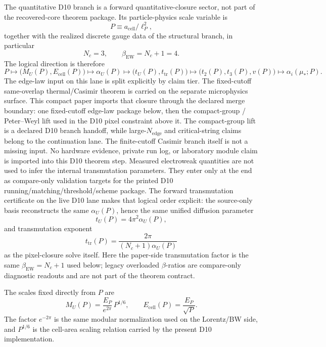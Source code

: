\documentclass[11pt]{article}
\begin{document}
The quantitative D10 branch is a forward quantitative-closure sector, not part of the recovered-core theorem package. Its particle-physics scale variable is
\[
P \equiv a_{\mathrm{cell}}/\ell_P^2,
\]
together with the realized discrete gauge data of the structural branch, in particular
\[
N_c=3,
\qquad
\beta_{\mathrm{EW}}=N_c+1=4.
\]
The logical direction is therefore
\[
P
\longmapsto
\bigl(M_U(P),E_{\mathrm{cell}}(P)\bigr)
\longmapsto
\alpha_U(P)
\longmapsto
\bigl(t_U(P),t_{\mathrm{tr}}(P)\bigr)
\longmapsto
\bigl(t_2(P),t_3(P),v(P)\bigr)
\longmapsto
\alpha_i(\mu_\ast;P).
\]
The edge-law input on this lane is split explicitly by claim tier. The fixed-cutoff
same-overlap thermal/Casimir theorem is carried on the separate microphysics surface. This
compact paper imports that closure through the declared merge boundary: one fixed-cutoff
edge-law package below, then the compact-group / Peter--Weyl lift used in the D10 pixel
constraint above it. The compact-group lift is a declared D10 branch handoff, while
large-\(N_{\mathrm{edge}}\) and critical-string claims belong to the continuation lane. The
finite-cutoff Casimir branch itself is not a missing input. No hardware evidence, private run
log, or laboratory module claim is imported into this D10 theorem step.
Measured electroweak quantities are not used to infer the internal transmutation parameters. They enter only at the end as compare-only validation targets for the printed D10 running/matching/threshold/scheme package.
The forward transmutation certificate on the live D10 lane makes that logical order explicit: the source-only basis reconstructs the same \(\alpha_U(P)\), hence the same unified diffusion parameter
\[
t_U(P)=4\pi^2\alpha_U(P),
\]
and transmutation exponent
\[
t_{\mathrm{tr}}(P)=\frac{2\pi}{(N_c+1)\alpha_U(P)}
\]
as the pixel-closure solve itself. Here the paper-side transmutation factor is the same
\(\beta_{\mathrm{EW}}=N_c+1\) used below; legacy overloaded \(\beta\)-ratios are compare-only
diagnostic readouts and are not part of the theorem contract.

The scales fixed directly from \(P\) are
\[
M_U(P)=\frac{E_P}{e^{2\pi}}\,P^{1/6},
\qquad
E_{\mathrm{cell}}(P)=\frac{E_P}{\sqrt P}.
\]
The factor \(e^{-2\pi}\) is the same modular normalization used on the Lorentz/BW side, and \(P^{1/6}\) is the cell-area scaling relation carried by the present D10 implementation.
\end{document}

